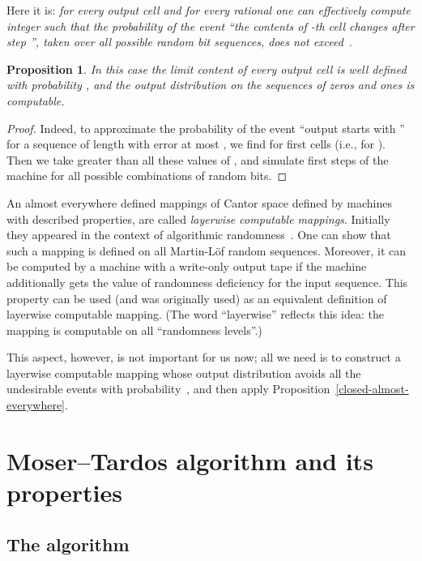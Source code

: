 \documentclass[12pt]{article}
\newtheorem{proposition}{Proposition}
\begin{document}
Here it is: \emph{for every output cell  and for every rational  one can effectively compute integer  such that the probability of the event ``the contents of -th cell changes after step '', taken over all possible random bit sequences, does not exceed~}.

\begin{proposition}\label{output-layerwise}
 In this case the limit content of every output cell is well defined with probability , and the output distribution on the sequences of zeros and ones is computable.
\end{proposition}

\begin{proof}
Indeed, to approximate the probability of the event ``output starts with '' for a sequence  of length  with error at most , we find  for  first cells (i.e., for ). Then we take  greater than all these values of , and simulate first  steps of the machine for all possible combinations of random bits.
\end{proof}

An almost everywhere defined mappings of Cantor space defined by machines with described properties, are called \emph{layerwise computable mappings}. Initially they appeared in the context of algorithmic randomness~\cite{hoyrup-rojas}. One can show that such a mapping is defined on all Martin-L\"of random sequences. Moreover, it can be computed by a machine with a write-only output tape if the machine additionally gets the value of randomness deficiency for the input sequence. This property can be used (and was originally used) as an equivalent definition of layerwise computable mapping. (The word ``layerwise'' reflects this idea: the mapping is computable on all ``randomness levels''.)

This aspect, however, is not important for us now; all we need is to construct a layerwise computable mapping whose output distribution avoids all the undesirable events  with probability~, and then apply Proposition~\ref{closed-almost-everywhere}.

\section{Moser--Tardos algorithm and its properties}

\subsection{The algorithm}
\end{document}
